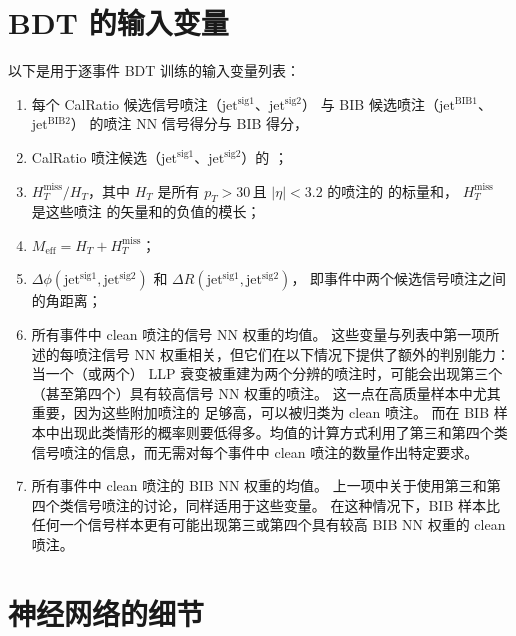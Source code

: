 \chapter{BDT 的输入变量}
\label{cpm:BDT}

以下是用于逐事件 BDT 训练的输入变量列表：

\begin{enumerate}
      \item 每个 CalRatio 候选信号喷注（$\text{jet}^{\text{sig}1}$、$\text{jet}^{\text{sig}2}$）
            与 BIB 候选喷注（$\text{jet}^{\text{BIB}1}$、$\text{jet}^{\text{BIB}2}$）
            的喷注 NN 信号得分与 BIB 得分，

      \item CalRatio 喷注候选（$\text{jet}^{\text{sig}1}$、$\text{jet}^{\text{sig}2}$）的 \pt ；

      \item $H_T^{\text{miss}} / H_T$，其中 $H_T$ 是所有 $p_T > 30$\,\GeV 且 $|\eta| < 3.2$ 的喷注的 \pt 的标量和，
            $H_T^{\text{miss}}$ 是这些喷注 \pt 的矢量和的负值的模长；

      \item $M_{\text{eff}} = H_T + H_T^{\text{miss}} $；

      \item $\Delta \phi (\text{jet}^{\text{sig}1}, \text{jet}^{\text{sig}2})$ 和
            $\Delta R(\text{jet}^{\text{sig}1}, \text{jet}^{\text{sig}2})$，
            即事件中两个候选信号喷注之间的角距离；

      \item 所有事件中 clean 喷注的信号 NN 权重的均值。
            这些变量与列表中第一项所述的每喷注信号 NN 权重相关，但它们在以下情况下提供了额外的判别能力：
            当一个（或两个） LLP 衰变被重建为两个分辨的喷注时，可能会出现第三个（甚至第四个）具有较高信号 NN 权重的喷注。
            这一点在高质量样本中尤其重要，因为这些附加喷注的 \pt 足够高，可以被归类为 clean 喷注。
            而在 BIB 样本中出现此类情形的概率则要低得多。均值的计算方式利用了第三和第四个类信号喷注的信息，而无需对每个事件中 clean 喷注的数量作出特定要求。

      \item 所有事件中 clean 喷注的 BIB NN 权重的均值。
            上一项中关于使用第三和第四个类信号喷注的讨论，同样适用于这些变量。
            在这种情况下，BIB 样本比任何一个信号样本更有可能出现第三或第四个具有较高 BIB NN 权重的 clean 喷注。
\end{enumerate}


\chapter{神经网络的细节}
